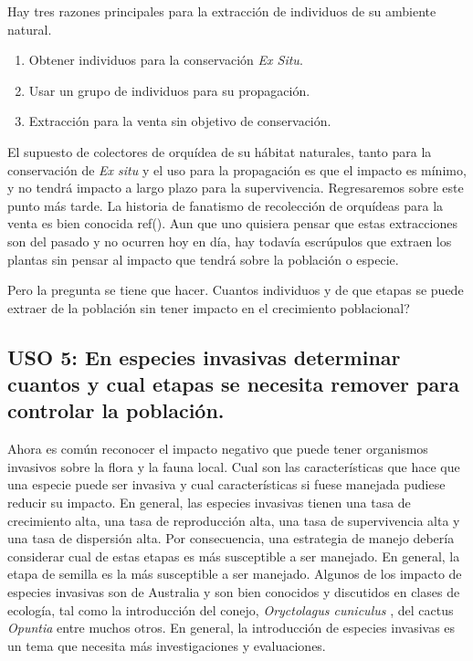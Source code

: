 \documentclass[
]{book}
\providecommand{\tightlist}{%
  \setlength{\itemsep}{0pt}\setlength{\parskip}{0pt}}
\theoremstyle{definition}
\theoremstyle{definition}
\theoremstyle{definition}
\theoremstyle{definition}
\theoremstyle{remark}
\begin{document}
Hay tres razones principales para la extracción de individuos de su ambiente natural.

\begin{enumerate}
\def\labelenumi{\arabic{enumi}.}
\tightlist
\item
  Obtener individuos para la conservación \emph{Ex Situ}.
\item
  Usar un grupo de individuos para su propagación.
\item
  Extracción para la venta sin objetivo de conservación.
\end{enumerate}

El supuesto de colectores de orquídea de su hábitat naturales, tanto para la conservación de \emph{Ex situ} y el uso para la propagación es que el impacto es mínimo, y no tendrá impacto a largo plazo para la supervivencia. Regresaremos sobre este punto más tarde. La historia de fanatismo de recolección de orquídeas para la venta es bien conocida ref(). Aun que uno quisiera pensar que estas extracciones son del pasado y no ocurren hoy en día, hay todavía escrúpulos que extraen los plantas sin pensar al impacto que tendrá sobre la población o especie.

Pero la pregunta se tiene que hacer. Cuantos individuos y de que etapas se puede extraer de la población sin tener impacto en el crecimiento poblacional?

\subsection{USO 5: En especies invasivas determinar cuantos y cual etapas se necesita remover para controlar la población.}\label{uso-5-en-especies-invasivas-determinar-cuantos-y-cual-etapas-se-necesita-remover-para-controlar-la-poblaciuxf3n.}

Ahora es común reconocer el impacto negativo que puede tener organismos invasivos sobre la flora y la fauna local. Cual son las características que hace que una especie puede ser invasiva y cual características si fuese manejada pudiese reducir su impacto. En general, las especies invasivas tienen una tasa de crecimiento alta, una tasa de reproducción alta, una tasa de supervivencia alta y una tasa de dispersión alta. Por consecuencia, una estrategia de manejo debería considerar cual de estas etapas es más susceptible a ser manejado. En general, la etapa de semilla es la más susceptible a ser manejado. Algunos de los impacto de especies invasivas son de Australia y son bien conocidos y discutidos en clases de ecología, tal como la introducción del conejo, \emph{Oryctolagus cuniculus} \citep{alves2022single}, del cactus \emph{Opuntia} \citep{novoa2015introduced} entre muchos otros. En general, la introducción de especies invasivas es un tema que necesita más investigaciones y evaluaciones.
\end{document}
